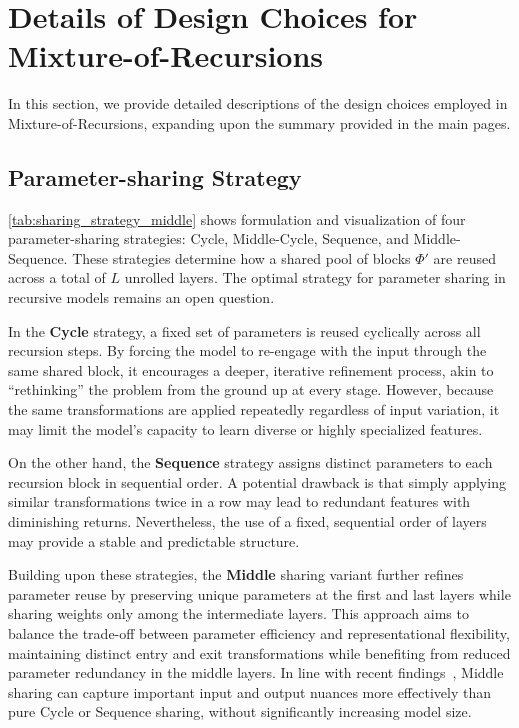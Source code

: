 \setlength{\cftbeforesecskip}{16pt}
\setlength{\cftbeforesubsecskip}{4pt}
\renewcommand\cftsecpagefont{\color{RoyalBlue}}
\renewcommand\cftsubsecpagefont{\color{RoyalBlue}}
\renewcommand\cftsubsubsecpagefont{\color{RoyalBlue}}
\renewcommand{\contentsname}{\large{Contents}}
{
  \hypersetup{linkcolor=}
  \tableofcontents
}


\clearpage


\section{Details of Design Choices for Mixture-of-Recursions}
\label{appx:mor_design_choices}

In this section, we provide detailed descriptions of the design choices employed in Mixture-of-Recursions, expanding upon the summary provided in the main pages.


\subsection{Parameter-sharing Strategy}
\label{app:sharing_strategy}



\autoref{tab:sharing_strategy_middle} shows formulation and visualization of four parameter-sharing strategies: Cycle, Middle-Cycle, Sequence, and Middle-Sequence. These strategies determine how a shared pool of blocks $\Phi'$ are reused across a total of $L$ unrolled layers. The optimal strategy for parameter sharing in recursive models remains an open question.

In the \textbf{Cycle} strategy, a fixed set of parameters is reused cyclically across all recursion steps. By forcing the model to re-engage with the input through the same shared block, it encourages a deeper, iterative refinement process, akin to ``rethinking'' the problem from the ground up at every stage.
However, because the same transformations are applied repeatedly regardless of input variation, it may limit the model’s capacity to learn diverse or highly specialized features.


On the other hand, the \textbf{Sequence} strategy assigns distinct parameters to each recursion block in sequential order. A potential drawback is that simply applying similar transformations twice in a row may lead to redundant features with diminishing returns. Nevertheless, the use of a fixed, sequential order of layers may provide a stable and predictable structure.


Building upon these strategies, the \textbf{Middle} sharing variant further refines parameter reuse by preserving unique parameters at the first and last layers while sharing weights only among the intermediate layers. This approach aims to balance the trade-off between parameter efficiency and representational flexibility, maintaining distinct entry and exit transformations while benefiting from reduced parameter redundancy in the middle layers. In line with recent findings~\citep{kim2023solar, geiping2025scaling}, Middle sharing can capture important input and output nuances more effectively than pure Cycle or Sequence sharing, without significantly increasing model size.



